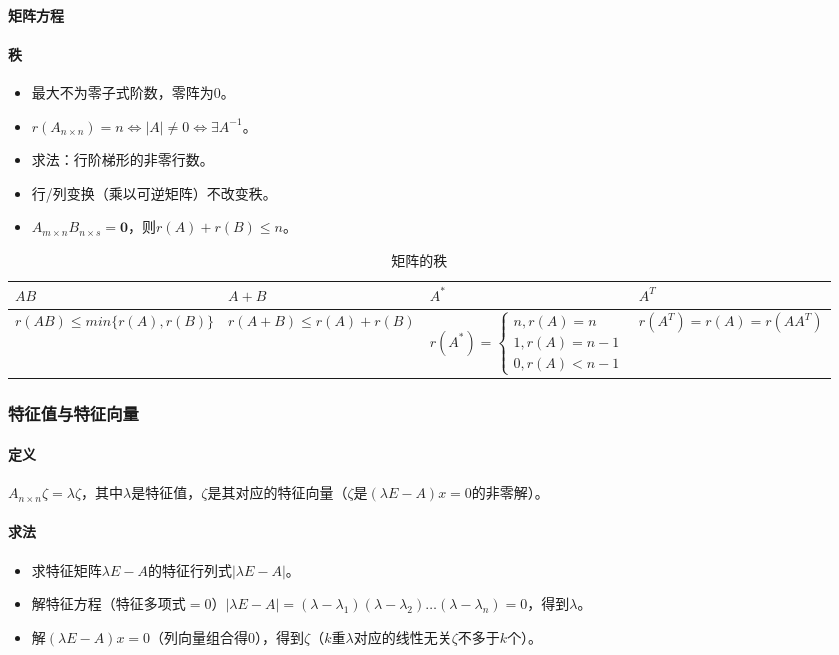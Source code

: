 \documentclass[
12pt, %
a4paper, 
oneside, %
headinclude,footinclude, %
]{scrartcl}
\begin{document}
\paragraph{矩阵方程}
\paragraph{秩}
\begin{itemize}
\item 最大不为零子式阶数，零阵为$ 0 $。
\item $ r(A_{n \times n}) = n \Leftrightarrow |A| \neq 0 \Leftrightarrow \exists A^{-1} $。
\item 求法：行阶梯形的非零行数。
\item 行/列变换（乘以可逆矩阵）不改变秩。
\item $ A_{m \times n}B_{n \times s} = \mathbf{0} $，则$ r(A) + r(B) \leq n $。
\end{itemize}

\begin{table}[H]
\centering
\begin{tabular}{|p{3.8cm}|p{3.8cm}|p{3.8cm}|p{3.8cm}|}
\hline
$ AB $ & $ A + B $ & $ A^* $ & $ A^T $ \\
\hline
$ r(AB) \leq min\{r(A), r(B)\} $ & $ r(A + B) \leq r(A) + r(B) $ & $ r(A^*) = \begin{cases} n, r(A) = n \\ 1,  r(A) = n - 1 \\ 0, r(A) < n - 1 \end{cases} $ & $ r(A^T) = r(A) = r(AA^T) $ \\
\hline
\end{tabular}
\caption{矩阵的秩}
\end{table}
\subsubsection[特征值与特征向量]{特征值与特征向量}
\paragraph{定义}
$ A_{n \times n}\zeta = \lambda\zeta $，其中$ \lambda $是特征值，$ \zeta $是其对应的特征向量（$ \zeta $是$ (\lambda E - A)x = 0 $的非零解）。
\paragraph{求法}
\begin{itemize}
\item 求特征矩阵$ \lambda E - A $的特征行列式$ |\lambda E - A| $。
\item 解特征方程（特征多项式$ = 0 $）$ |\lambda E - A| = (\lambda - \lambda_1)(\lambda - \lambda_2)\dots(\lambda - \lambda_n) = 0 $，得到$ \lambda $。
\item 解$ (\lambda E - A)x = 0 $（列向量组合得$ 0 $），得到$ \zeta $（$ k $重$ \lambda $对应的线性无关$ \zeta $不多于$ k $个）。
\end{itemize}
\end{document}
